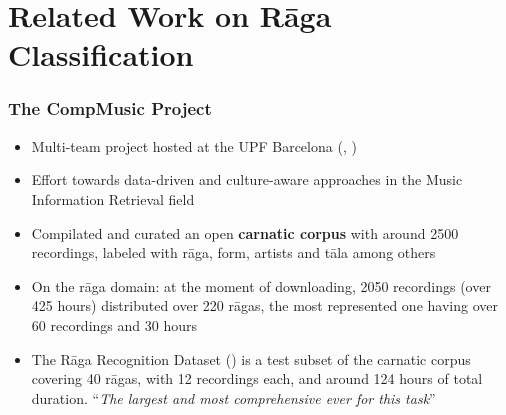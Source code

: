 \documentclass[hyperref={pdfpagelabels=false}]{beamer}
\begin{document}
     \section{Related Work on R\=aga Classification}
     \frame{\sectionpage}



     \begin{frame}
       \frametitle{The CompMusic Project}
       \begin{itemize}
       \item Multi-team project hosted at the UPF Barcelona (\cite{serra-comp11}, \cite{serra-comp14})
       \item Effort towards data-driven and culture-aware approaches in the Music Information Retrieval field
       \item Compilated and curated an open \textbf{carnatic corpus} with around 2500 recordings, labeled with r\=aga, form, artists and t\=ala among others\cite{indian-corpora}
       \item On the r\=aga domain: at the moment of downloading, 2050 recordings (over 425 hours) distributed over 220 r\=agas, the most represented one having over 60 recordings and 30 hours
       \item     The R\=aga Recognition Dataset () is a test subset of the carnatic corpus covering 40 r\=agas, with 12 recordings each, and around 124 hours of total duration\cite[p.84]{gulati}. ``{\it The largest and most comprehensive ever for this task}''\cite[p.183]{gulati}
       \end{itemize}


     \end{frame}
\end{document}
